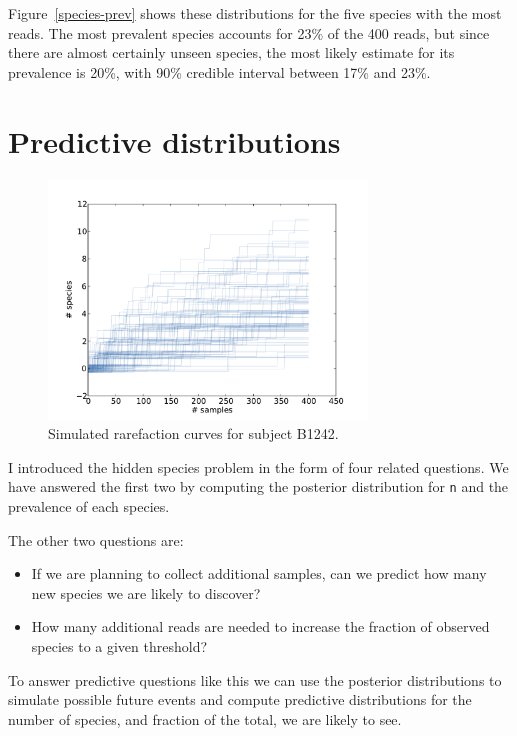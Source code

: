 \documentclass[12pt]{book}
\begin{document}
Figure~\ref{species-prev} shows these distributions for the five
species with the most reads.  The most prevalent species accounts for
23\% of the 400 reads, but since there are almost certainly unseen
species, the most likely estimate for its prevalence is 20\%,
with 90\% credible interval between 17\% and 23\%.

\section{Predictive distributions}

\begin{figure}
\centerline{\includegraphics[height=2.5in]{figs/species-rare-B1242.pdf}}
\caption{Simulated rarefaction curves for subject B1242.}
\label{species-rare}
\end{figure}

I introduced the hidden species problem in the form of four related
questions.  We have answered the first two by computing the posterior
distribution for {\tt n} and the prevalence of each species.

The other two questions are:

\begin{itemize}

\item If we are planning to collect additional samples, can we predict
  how many new species we are likely to discover?

\item How many additional reads are needed to increase the
  fraction of observed species to a given threshold?

\end{itemize}

To answer predictive questions like this we can use the posterior
distributions to simulate possible future events and compute
predictive distributions for the number of species, and fraction of
the total, we are likely to see.
\end{document}
